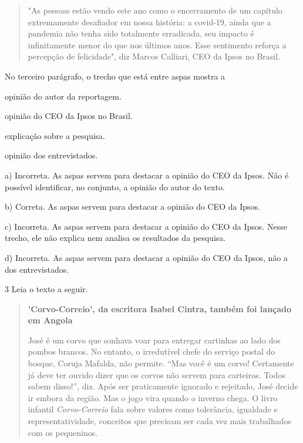 \begin{escolha}
\begin{escolha}
\begin{escolha}
{{\begin{quote}
"As pessoas estão vendo este ano como o encerramento de um capítulo
extremamente desafiador em nossa história: a covid-19, ainda que a
pandemia não tenha sido totalmente erradicada, seu impacto é
infinitamente menor do que nos últimos anos. Esse sentimento reforça a
percepção de felicidade", diz Marcos Calliari, CEO da Ipsos no Brasil.

\end{quote}

No terceiro parágrafo, o trecho que está entre aspas mostra a

\begin{escolha}
\item opinião do autor da reportagem.

\item opinião do CEO da Ipsos no Brasil.

\item explicação sobre a pesquisa.

\item opinião dos entrevistados.
\end{escolha}


a) Incorreta. As aspas servem para destacar a opinião do CEO da Ipsos. Não é
possível identificar, no conjunto, a opinião do autor do texto.  

b) Correta. As aspas servem para destacar a opinião do CEO da Ipsos.

c) Incorreta. As aspas servem para destacar a opinião do CEO da Ipsos. Nesse
trecho, ele não explica nem analisa os resultados da pesquisa.

d) Incorreta. As aspas servem para destacar a opinião do CEO da Ipsos, não
a dos entrevistados.

\num{3} Leia o texto a seguir.

\begin{quote}
\textbf{'Corvo-Correio', da escritora Isabel Cintra, também foi lançado 
em Angola}

José é um corvo que sonhava voar para entregar cartinhas ao lado dos
pombos brancos. No entanto, o irredutível chefe do serviço postal do
bosque, Coruja Mafalda, não permite. ``Mas você é um corvo! Certamente já
deve ter ouvido dizer que os corvos não servem para carteiros. Todos
sabem disso!'', diz. Após ser praticamente ignorado e rejeitado, José
decide ir embora da região. Mas o jogo vira quando o inverno chega. O
livro infantil \textit{Corvo-Correio} fala sobre valores como tolerância,
igualdade e representatividade, conceitos que precisam ser cada vez mais
trabalhados com os pequeninos.


\end{quote}}}
\end{escolha}
\end{escolha}
\end{escolha}
